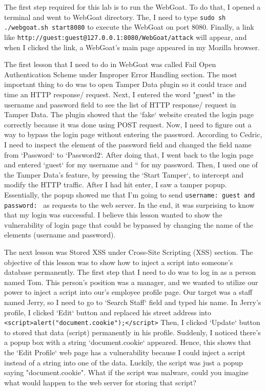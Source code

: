 \documentclass[letterpaper,10pt,titlepage,draftclsnofoot,onecolumn]{IEEEtran}
\begin{document}
The first step required for this lab is to run the WebGoat.
To do that, I opened a terminal and went to WebGoat directory. 
The, I need to type \verb|sudo sh ./webgoat.sh start8080| to execute the WebGoat on port 8080. 
Finally, a link like \verb|http://guest:guest@127.0.0.1:8080/WebGoat/attack| will appear, and when I clicked the link, a WebGoat's main page appeared in my Mozilla browser. 

The first lesson that I need to do in WebGoat was called Fail Open Authentication Scheme under Improper Error Handling section. 
The most important thing to do was to open Tamper Data plugin so it could trace and time an HTTP response/ request.
Next, I entered the word "guest" in the username and password field to see the list of HTTP response/ request in Tamper Data. 
The plugin showed that the `fake` website created the login page correctly because it was done using POST request.
Now, I need to figure out a way to bypass the login page without entering the password. 
According to Cedric, I need to inspect the element of the password field and changed the field name from `Password` to `Password2`.
After doing that, I went back to the login page and entered `guest` for my username and `` for my password.
Then, I used one of the Tamper Data's feature, by pressing the `Start Tamper`, to intercept and modify the HTTP traffic.
After I had hit enter, I saw a tamper popup.
Essentially, the popup showed me that I'm going to send \verb|username: guest and password: | as requests to the web server.  
In the end, it was surprising to know that my login was successful. 
I believe this lesson wanted to show the vulnerability of login page that could be bypassed by changing the name of the elements (username and password).

The next lesson was Stored XSS under Cross-Site Scripting (XSS) section.
The objective of this lesson was to show how to inject a script into someone's database permanently.
The first step that I need to do was to log in as a person named Tom.
This person's position was a manager, and we wanted to utilize our power to inject a script into our's employee profile page.
Our target was a staff named Jerry, so I need to go to `Search Staff` field and typed his name. 
In Jerry's profile, I clicked `Edit` button and replaced his street address into \verb|<script>alert("document.cookie");</script>|
Then, I clicked `Update` button to stored that data (script) permanently in his profile.
Suddenly, I noticed there's a popup box with a string `document.cookie` appeared.
Hence, this shows that the `Edit Profile` web page has a vulnerability because I could inject a script instead of a string into one of the data. Luckily, the script was just a popup saying "document.cookie". 
What if the script was malware, could you imagine what would happen to the web server for storing that script? 
\end{document}
